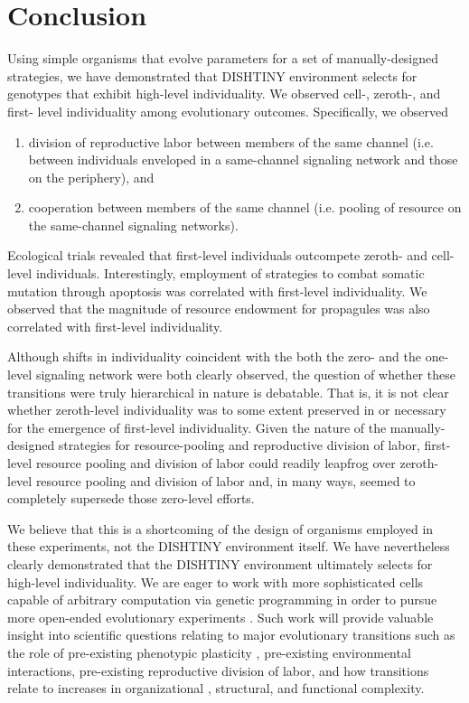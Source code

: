 \section{Conclusion}

Using simple organisms that evolve parameters for a set of manually-designed strategies, we have demonstrated that DISHTINY environment selects for genotypes that exhibit high-level individuality.
We observed cell-, zeroth-, and first- level individuality among evolutionary outcomes.
Specifically, we observed
\begin{enumerate}
  \item division of reproductive labor between members of the same channel (i.e. between individuals enveloped in a same-channel signaling network and those on the periphery), and
  \item cooperation between members of the same channel (i.e. pooling of resource on the same-channel signaling networks).
\end{enumerate}

Ecological trials revealed that first-level individuals outcompete zeroth- and cell-level individuals.
Interestingly, employment of strategies to combat somatic mutation through apoptosis was correlated with first-level individuality.
We observed that the magnitude of resource endowment for propagules was also correlated with first-level individuality.

Although shifts in individuality coincident with the both the zero- and the one-level signaling network were both clearly observed, the question of whether these transitions were truly hierarchical in nature is debatable.
That is, it is not clear whether zeroth-level individuality was to some extent preserved in or necessary for the emergence of first-level individuality.
Given the nature of the manually-designed strategies for resource-pooling and reproductive division of labor, first-level resource pooling and division of labor could readily leapfrog over zeroth-level resource pooling and division of labor and, in many ways, seemed to completely supersede those zero-level efforts.

We believe that this is a shortcoming of the design of organisms employed in these experiments, not the DISHTINY environment itself.
We have nevertheless clearly demonstrated that the DISHTINY environment ultimately selects for high-level individuality.
We are eager to work with more sophisticated cells capable of arbitrary computation via genetic programming in order to pursue more open-ended evolutionary experiments \cite{ofria2004avida}.
Such work will provide valuable insight into scientific questions relating to major evolutionary transitions such as the role of pre-existing phenotypic plasticity \citep{clune2007investigating, lalejini2016evolutionary}, pre-existing environmental interactions, pre-existing reproductive division of labor, and how transitions relate to increases in organizational \citep{goldsby2012task}, structural, and functional \citep{goldsby2014evolutionary} complexity.

